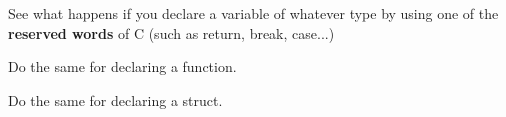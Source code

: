 
See what happens if you declare a variable of whatever type
by using one of the \textbf{reserved words} of C (such as return, break, case...)

Do the same for declaring a function.

Do the same for declaring a struct.
